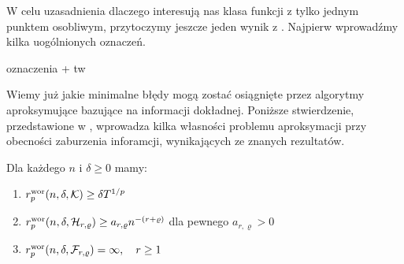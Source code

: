 \documentclass[oik, pdftex, robocza, man]{mgrwms}
\begin{document}
    W celu uzasadnienia dlaczego interesują nas klasa funkcji z tylko jednym punktem osobliwym, przytoczymy jeszcze jeden wynik z \cite{PoA}. Najpierw wprowadźmy kilka uogólnionych oznaczeń.

    \begin{thm}
        oznaczenia + tw
    \end{thm}

    Wiemy już jakie minimalne błędy mogą zostać osiągnięte przez algorytmy aproksymujące bazujące na informacji dokładnej. Poniższe stwierdzenie, przedstawione w \cite{AoP}, wprowadza kilka własności problemu aproksymacji przy obecności zaburzenia inforamcji, wynikających ze znanych rezultatów.

    \begin{stw} \label{stw1}
        Dla każdego $n$ i $\delta \geq 0$ mamy:
        \begin{enumerate}[label=(\roman*)]
            \item \label{stw1_i} $r^{\mathrm{wor}}_{p}(n, \delta, \mathcal{K}) \geq \delta T^{1/p}$
            \item \label{stw1_ii} $r^{\mathrm{wor}}_{p}(n, \delta, \mathcal{H}_{r,\varrho}) \geq a_{r,\varrho}n^{-(r + \varrho)}$ dla pewnego $a_{r,\varrho} > 0$
            \item \label{stw1_iii} $r^{\mathrm{wor}}_{p}(n, \delta, \mathcal{F}_{r,\varrho}) = \infty, \quad r \geq 1$
        \end{enumerate}
    \end{stw}
\end{document}

